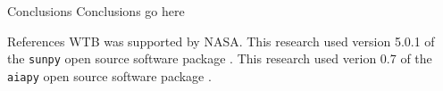 \documentclass[final]{beamer}
\newlength{\sepwidth}
\newlength{\colwidth}
\newcommand{\separatorcolumn}{\begin{column}{\sepwidth}\end{column}}
\begin{document}
\begin{frame}[t]
\begin{columns}[t]
\begin{column}{\colwidth}
\begin{block}{Conclusions}
    Conclusions go here

  \end{block}

  \begin{block}{References}
    \scriptsize
    WTB was supported by NASA.
    This research used version 5.0.1 of the \texttt{sunpy} open source software package \citep{the_sunpy_community_sunpy_2020}.
    This research used verion 0.7 of the \texttt{aiapy} open source software package \citep{barnes_aiapy_2020}.
    \begin{multicols}{2}
      
      
    \end{multicols}
  \end{block}

\end{column}

\separatorcolumn
\end{columns}
\end{frame}
\end{document}
